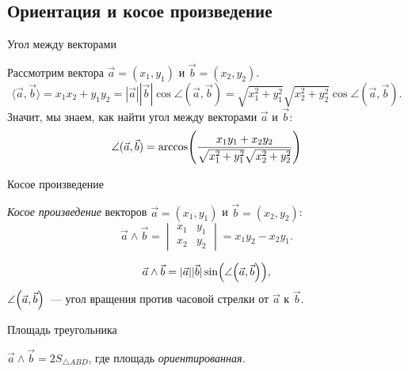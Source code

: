 \subsection{Ориентация и косое произведение}

\begin{frame}{Угол между векторами}

	Рассмотрим вектора $\vec{a} = (x_1, y_1)$ и $\vec{b} = (x_2, y_2)$.
	\[ \langle \vec{a}, \vec{b} \rangle = x_1 x_2 + y_1 y_2 = |\vec{a}||\vec{b}| \cos{\angle{(\vec{a}, \vec{b})}} = \sqrt{x_1^2 + y_1^2}\sqrt{x_2^2 + y_2^2} \cos{\angle(\vec{a}, \vec{b})}.\]
	Значит, мы знаем, как найти угол между векторами $\vec{a}$ и $\vec{b}$:
	\[ \angle(\vec{a}, \vec{b}) = \arccos\lr*{\frac{x_1 y_1 + x_2 y_2}{\sqrt{x_1^2 + y_1^2} \sqrt{x_2^2 + y_2^2}}} \]

\end{frame}

\begin{frame}{Косое произведение}
  \begin{defn}
    {\itshape Косое произведение} векторов $\vec{a} = (x_1, y_1)$ и $\vec{b} = (x_2, y_2)$:
      \[ \vec{a} \wedge \vec{b} =  \begin{vmatrix} x_1 & y_1 \\ x_2 & y_2 \end{vmatrix}
        = x_1 y_2 - x_2 y_1.\]
  \end{defn}

  \begin{thm}
    \[\vec{a} \wedge \vec{b} = |\vec{a}| |\vec{b}| \sin \lr*{\angle \lr*{\vec{a},\vec{b}}},\]
    $\angle\lr*{\vec{a}, \vec{b}}$~—
    угол вращения против часовой стрелки от $\vec{a}$ к $\vec{b}$.
  \end{thm}  \vspace{-1cm}
\end{frame}


\begin{frame}{Площадь треугольника}
\begin{thm}
  $\vec{a} \wedge \vec{b} = 2 S_{\triangle{ABD}}$, где площадь {\itshape ориентированная.}

	\begin{center}  \end{center}
\end{thm} \vspace{-0.8cm}
\end{frame}


